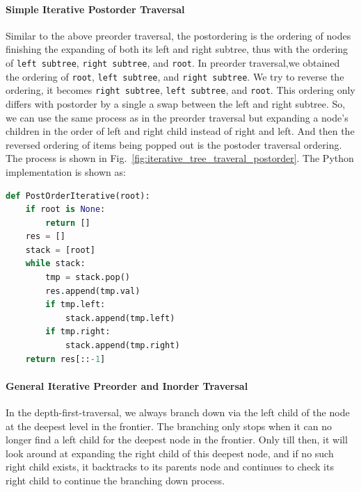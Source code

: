 \documentclass[main.tex]{subfiles}
\begin{document}
\paragraph{Simple Iterative Postorder Traversal} Similar to the above preorder traversal, the postordering is the ordering of nodes finishing the expanding of both its left and right subtree, thus with the ordering of  \texttt{left subtree}, \texttt{right subtree}, and \texttt{root}.   In preorder traversal,we obtained the ordering of  \texttt{root}, \texttt{left subtree}, and \texttt{right subtree}.  We try to reverse the ordering, it becomes \texttt{right subtree}, \texttt{left subtree}, and \texttt{root}.  This ordering only differs with postorder by a single a swap between the left and right subtree. So, we can use the same process as in the preorder traversal but expanding a node's children in the order of left and right child instead of right and left. And then the reversed ordering of items being popped out is the postoder traversal ordering. The process is shown in Fig.~\ref{fig:iterative_tree_traveral_postorder}. The Python implementation is shown as:
\begin{lstlisting}[language=Python]
def PostOrderIterative(root):
    if root is None:
        return []
    res = []
    stack = [root]
    while stack:
        tmp = stack.pop()
        res.append(tmp.val)
        if tmp.left:
            stack.append(tmp.left)
        if tmp.right:
            stack.append(tmp.right)
    return res[::-1]
\end{lstlisting}

\paragraph{General Iterative Preorder and Inorder Traversal } In the depth-first-traversal, we always branch down via the left child of the node at the deepest level in the frontier. The branching only stops when it can no longer find a left child for the deepest node in the frontier. Only till then, it will look around at expanding the right child of this deepest node, and if no such right child exists, it backtracks to its parents node and continues to check its right child to continue the branching down process. 
\end{document}
